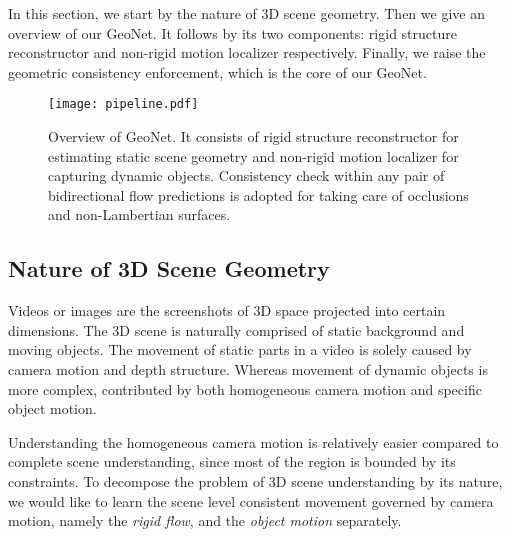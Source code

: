 
In this section, we start by the nature of 3D scene geometry. Then we give an overview of our GeoNet. It follows by its two components: rigid structure reconstructor and non-rigid motion localizer respectively. Finally, we raise the geometric consistency enforcement, which is the core of our GeoNet.

\begin{figure*}[t]
\begin{center}
   \texttt{[image: pipeline.pdf]}
\end{center}
\vspace{-1ex}
   \caption{Overview of GeoNet. It consists of rigid structure reconstructor for estimating static scene geometry and non-rigid motion localizer for capturing dynamic objects.
Consistency check within any pair of bidirectional flow predictions is adopted for taking care of occlusions and non-Lambertian surfaces.} \vspace{-2ex}
\label{fig::pipeline}
\end{figure*}
\subsection{Nature of 3D Scene Geometry}\label{sec::3dscene}

Videos or images are the screenshots of 3D space projected into certain dimensions. The 3D scene is naturally comprised of static background and moving objects. The movement of static parts in a video is solely caused by camera motion and depth structure. Whereas movement of dynamic objects is more complex, contributed by both homogeneous camera motion and specific object motion.

Understanding the homogeneous camera motion is relatively easier compared to complete scene understanding, since most of the region is bounded by its constraints. To decompose the problem of 3D scene understanding by its nature, we would like to learn the scene level consistent movement governed by camera motion, namely the \textit{rigid flow}, and the \textit{object motion} separately. 

